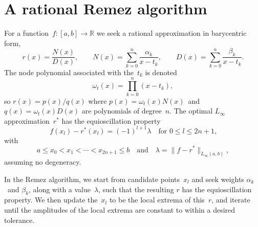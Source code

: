 \documentclass[12pt,a4paper]{article}
\begin{document}
\section{A rational Remez algorithm}
For a function~$f:[a,b]\to\mathbb{R}$ we seek a rational approximation in 
barycentric form,
\[
r(x)=\frac{N(x)}{D(x)},\qquad
N(x)=\sum_{k=0}^n\frac{\alpha_k}{x-t_k},\qquad
D(x)=\sum_{k=0}^n\frac{\beta_k}{x-t_k}.
\]
The node polynomial associated with the~$t_k$ is denoted
\[
\omega_t(x)=\prod_{k=0}^n(x-t_k),
\]
so $r(x)=p(x)/q(x)$ where $p(x)=\omega_t(x)N(x)$~and $q(x)=\omega_t(x)D(x)$ are 
polynomials of degree~$n$.  The optimal $L_\infty$ approximation~$r^*$ has the 
equioscillation property
\[
f(x_l)-r^*(x_l)=(-1)^{l+1}\lambda\quad\text{for $0\le l\le 2n+1$,}
\]
with 
\[
a\le x_0<x_1<\cdots<x_{2n+1}\le b\quad\text{and}\quad
\lambda=\|f-r^*\|_{L_\infty(a,b)},
\]
assuming no degeneracy.

In the Remez algorithm, we start from candidate points~$x_l$ and seek weights
$\alpha_k$~and $\beta_k$, along with a value~$\lambda$, such that the resulting
$r$ has the equioscillation property.  We then update the~$x_l$ to be the local 
extrema of this~$r$, and iterate until the amplitudes of the local extrema are 
constant to within a desired tolerance.
\end{document}
